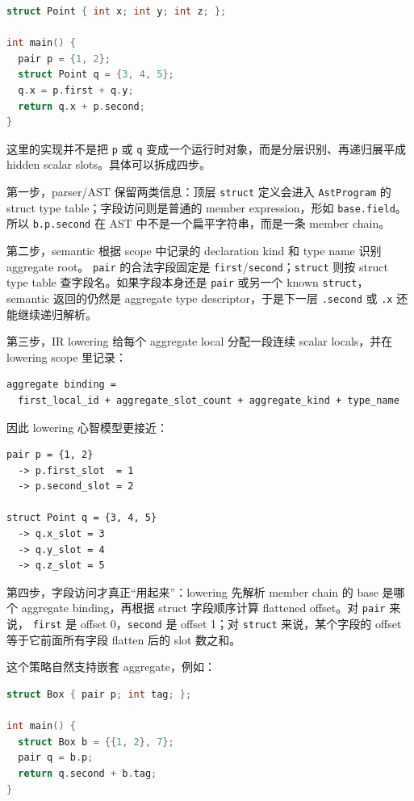 \documentclass[UTF8,a4paper,11pt]{ctexart}
\begin{document}
\newpage
\begin{lstlisting}[language=C]
struct Point { int x; int y; int z; };

int main() {
  pair p = {1, 2};
  struct Point q = {3, 4, 5};
  q.x = p.first + q.y;
  return q.x + p.second;
}
\end{lstlisting}

这里的实现并不是把 \texttt{p} 或 \texttt{q} 变成一个运行时对象，而是分层识别、再递归展平成
hidden scalar slots。具体可以拆成四步。

第一步，parser/AST 保留两类信息：顶层 \texttt{struct} 定义会进入 \texttt{AstProgram} 的
struct type table；字段访问则是普通的 member expression，形如 \texttt{base.field}。所以
\texttt{b.p.second} 在 AST 中不是一个扁平字符串，而是一条 member chain。

第二步，semantic 根据 scope 中记录的 declaration kind 和 type name 识别 aggregate root。
\texttt{pair} 的合法字段固定是 \texttt{first}/\texttt{second}；\texttt{struct} 则按
struct type table 查字段名。如果字段本身还是 \texttt{pair} 或另一个 known \texttt{struct}，
semantic 返回的仍然是 aggregate type descriptor，于是下一层 \texttt{.second} 或 \texttt{.x}
还能继续递归解析。

第三步，IR lowering 给每个 aggregate local 分配一段连续 scalar locals，并在 lowering scope
里记录：

\begin{lstlisting}[language={}]
aggregate binding =
  first_local_id + aggregate_slot_count + aggregate_kind + type_name
\end{lstlisting}

因此 lowering 心智模型更接近：

\begin{lstlisting}[language={}]
pair p = {1, 2}
  -> p.first_slot  = 1
  -> p.second_slot = 2

struct Point q = {3, 4, 5}
  -> q.x_slot = 3
  -> q.y_slot = 4
  -> q.z_slot = 5
\end{lstlisting}

第四步，字段访问才真正“用起来”：lowering 先解析 member chain 的 base 是哪个 aggregate
binding，再根据 struct 字段顺序计算 flattened offset。对 \texttt{pair} 来说，
\texttt{first} 是 offset 0，\texttt{second} 是 offset 1；对 \texttt{struct} 来说，某个字段的
offset 等于它前面所有字段 flatten 后的 slot 数之和。

这个策略自然支持嵌套 aggregate，例如：

\begin{lstlisting}[language=C]
struct Box { pair p; int tag; };

int main() {
  struct Box b = {{1, 2}, 7};
  pair q = b.p;
  return q.second + b.tag;
}
\end{lstlisting}
\end{document}
